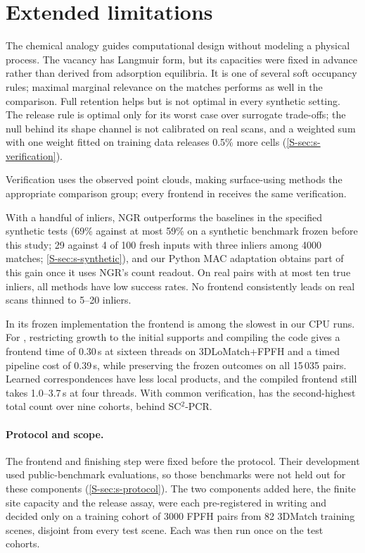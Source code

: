 \section{Extended limitations}
\label{S-sec:s-limitations}

The chemical analogy guides computational design without modeling a physical process. The vacancy has Langmuir form, but its capacities were fixed in advance rather than derived from adsorption equilibria. It is one of several soft occupancy rules; maximal marginal relevance on the matches performs as well in the comparison. Full retention helps but is not optimal in every synthetic setting. The release rule is optimal only for its worst case over surrogate trade-offs; the null behind its shape channel is not calibrated on real scans, and a weighted sum with one weight fitted on training data releases 0.5\% more cells (\cref{S-sec:s-verification}).

Verification uses the observed point clouds, making surface-using methods the appropriate comparison group; every frontend in  receives the same verification.

With a handful of inliers, NGR outperforms the baselines in the specified synthetic tests (69\% against at most 59\% on a synthetic benchmark frozen before this study; 29 against 4 of 100 fresh inputs with three inliers among 4000 matches; \cref{S-sec:s-synthetic}), and our Python MAC adaptation obtains part of this gain once it uses NGR's count readout. On real pairs with at most ten true inliers, all methods have low success rates. No frontend consistently leads on real scans thinned to 5--20 inliers.

In its frozen implementation the \ngr{} frontend is among the slowest in our CPU runs. For \ls{}, restricting growth to the initial supports and compiling the code gives a frontend time of 0.30\,s at sixteen threads on 3DLoMatch+FPFH and a timed pipeline cost of 0.39\,s, while preserving the frozen outcomes on all 15\,035 pairs. Learned correspondences have less local products, and the compiled frontend still takes 1.0--3.7\,s at four threads. With common verification, \ls{} has the second-highest total count over nine cohorts, behind SC$^2$-PCR.

\paragraph{Protocol and scope.} The \ngr{} frontend and finishing step were fixed before the protocol. Their development used public-benchmark evaluations, so those benchmarks were not held out for these components (\cref{S-sec:s-protocol}). The two components added here, the finite site capacity and the release assay, were each pre-registered in writing and decided only on a training cohort of 3000 FPFH pairs from 82 3DMatch training scenes, disjoint from every test scene. Each was then run once on the test cohorts.

